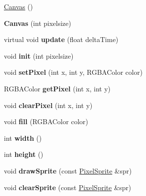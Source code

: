 \begin{DoxyCompactItemize}
\item 
\hyperlink{class_canvas_a5fce53f080ad6540094901f9768805a8}{Canvas} ()
\item 
\mbox{\label{class_canvas_a6b13d58b052c42d68e3d68a01cb8f6e9}} 
{\bfseries Canvas} (int pixelsize)
\item 
\mbox{\label{class_canvas_a20b219bfa7b0ccacf133f03e2d80764c}} 
virtual void {\bfseries update} (float delta\+Time)
\item 
\mbox{\label{class_canvas_a1395db675973b25403c93c86858ac980}} 
void {\bfseries init} (int pixelsize)
\item 
\mbox{\label{class_canvas_aeea330a891f999bd6524b66c07119f5c}} 
void {\bfseries set\+Pixel} (int x, int y, R\+G\+B\+A\+Color color)
\item 
\mbox{\label{class_canvas_a50d5ab64f46ae2a098c9b4e4649ad9be}} 
R\+G\+B\+A\+Color {\bfseries get\+Pixel} (int x, int y)
\item 
\mbox{\label{class_canvas_ad95a8d64e5ccee7585ce950989e95221}} 
void {\bfseries clear\+Pixel} (int x, int y)
\item 
\mbox{\label{class_canvas_a9871b19d9a70e110ab1e009912de8c6d}} 
void {\bfseries fill} (R\+G\+B\+A\+Color color)
\item 
\mbox{\label{class_canvas_afef4dc57abf127e369e004fe0d9a5597}} 
int {\bfseries width} ()
\item 
\mbox{\label{class_canvas_a515482fc400b41fc19954721d83d911e}} 
int {\bfseries height} ()
\item 
\mbox{\label{class_canvas_a293a398441f5565747f49ea5582c71e7}} 
void {\bfseries draw\+Sprite} (const \hyperlink{struct_pixel_sprite}{Pixel\+Sprite} \&spr)
\item 
\mbox{\label{class_canvas_a56b0cb001187d6b1143b7fff2e3d262e}} 
void {\bfseries clear\+Sprite} (const \hyperlink{struct_pixel_sprite}{Pixel\+Sprite} \&spr)
\end{DoxyCompactItemize}
